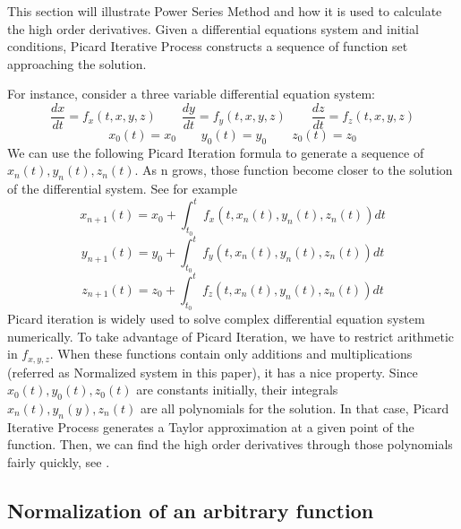 \documentclass[12pt]{article}
\begin{document}
This section will illustrate Power Series Method and how it is used to calculate the high order derivatives.
Given a differential equations system and initial conditions, Picard Iterative Process constructs a sequence of function set approaching the solution.

For instance, consider a three variable differential equation system:
\begin{equation}
\frac{dx}{dt} = f_{x}(t, x, y, z) \qquad
\frac{dy}{dt} = f_{y}(t, x, y, z) \qquad
\frac{dz}{dt} = f_{z}(t, x, y, z)
\end{equation}	
\begin{equation}
x_{0}(t) = x_{0} \qquad
y_{0}(t) = y_{0} \qquad
z_{0}(t) = z_{0}
\end{equation}
We can use the following Picard Iteration formula to generate a sequence of $x_{n}(t),y_{n}(t),z_{n}(t)$. As n grows, those function become closer to the solution of the differential system. See for example \cite{PICARD}
\begin{equation}
x_{n+1}(t) = x_{0} + \int_{t_{0}}^{t} f_{x}(t, x_{n}(t),y_{n}(t),z_{n}(t)) dt
\end{equation}
\begin{equation}
y_{n+1}(t) = y_{0} + \int_{t_{0}}^{t} f_{y}(t, x_{n}(t),y_{n}(t),z_{n}(t)) dt
\end{equation}
\begin{equation}
z_{n+1}(t) = z_{0} + \int_{t_{0}}^{t} f_{z}(t, x_{n}(t),y_{n}(t),z_{n}(t)) dt
\end{equation}
Picard iteration is widely used to solve complex differential equation system numerically. To take advantage of Picard Iteration, we have to restrict arithmetic in $f_{x,y,z}$. When these functions contain only additions and multiplications (referred as Normalized system in this paper), it has a nice property. Since $x_{0}(t),y_{0}(t),z_{0}(t)$ are constants initially, their integrals $x_{n}(t),y_{n}(y),z_{n}(t)$ are all polynomials for the solution. In that case, Picard Iterative Process generates a Taylor approximation at a given point of the function. Then, we can find the high order derivatives through those polynomials fairly quickly, see \cite{PSM}.

\subsection{Normalization of an arbitrary function}
\end{document}
